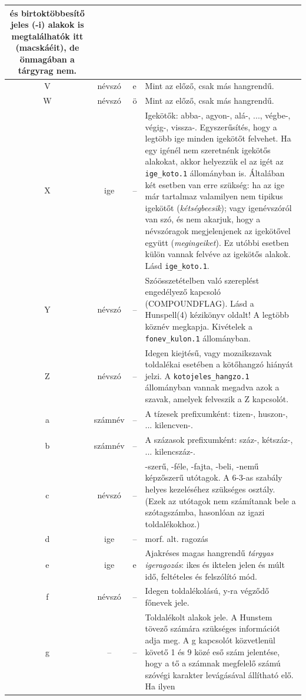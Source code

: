 \begin{longtable}[l]{cclp{12cm}}
és birtoktöbbesítő jeles (-i) alakok is megtalálhatók itt (macskáéit), de önmagában a
tárgyrag nem.
\\ \hline  V &  névszó & e & Mint az előző, csak más hangrendű.
\\ \hline  W &  névszó & ö & Mint az előző, csak más hangrendű.
\\ \hline  X &  ige & -- & Igekötők: abba-, agyon-, alá-, ..., végbe-, végig-, vissza-.
Egyszerűsítés, hogy a legtöbb ige minden igekötőt felvehet. Ha egy igénél
nem szeretnénk igekötős alakokat, akkor helyezzük el az igét az \texttt{ige\_koto.1} állományban
is. Általában két esetben van erre szükség: ha az ige már tartalmaz valamilyen
nem tipikus igekötőt (\emph{kétségbeesik}); vagy
igenévszóról van szó, és nem akarjuk, hogy a névszóragok megjelenjenek
az igekötővel együtt (\emph{megingeiket}). Ez utóbbi esetben külön
vannak felvéve az igekötős alakok. Lásd \texttt{ige\_koto.1}.
\\ \hline  Y &  névszó & -- & Szóösszetételben való szereplést engedélyező
kapcsoló (COMPOUNDFLAG). Lásd a Hunspell(4) kézikönyv oldalt! A legtöbb köznév
megkapja. Kivételek a \texttt{fonev\_kulon.1} állományban.
\\ \hline  Z &  névszó & -- & Idegen kiejtésű, vagy mozaikszavak toldalékai esetében
a kötőhangzó hiányát jelzi. A \texttt{kotojeles\_hangzo.1} állományban vannak megadva
azok a szavak, amelyek felveszik a Z kapcsolót.
\\ \hline  a &  számnév & -- & A tízesek prefixumként: tizen-, huszon-, ... kilencven-.
\\ \hline  b &  számnév & -- & A százasok prefixumként: száz-, kétszáz-, ... kilencszáz-.
\\ \hline  c &  névszó & -- & -szerű, -féle, -fajta, -beli, -nemű képzőszerű utótagok.
A 6-3-as szabály helyes kezeléséhez szükséges osztály. (Ezek az utótagok nem
számítanak bele a szótagszámba, hasonlóan az igazi toldalékokhoz.)
\\ \hline  d &  ige & -- & morf. alt. ragozás
\\ \hline  e &  ige & e & Ajakréses magas hangrendű \emph{tárgyas igeragozás}: ikes és iktelen jelen és múlt
idő, feltételes és felszólító mód.
\\ \hline  f & névszó & -- & Idegen toldalékolású, y-ra végződő főnevek jele.
\\ \hline  g & -- & -- &  Toldalékolt alakok jele. A Hunstem tövező számára szükséges információt
adja meg. A g kapcsolót közvetlenül követő 1 és 9 közé eső szám jelentése, hogy a
tő a számnak megfelelő számú szóvégi karakter levágásával állítható elő. Ha ilyen

\end{longtable}
